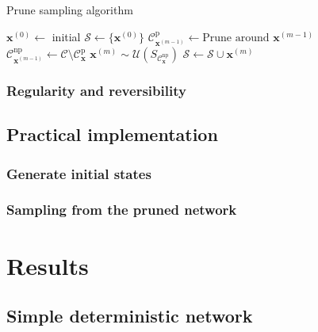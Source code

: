 \documentclass[a4paper, twoside, 11pt]{report}
\theoremstyle{plain}
\theoremstyle{definition}
\theoremstyle{remark}
\newcommand{\C}{{\mathcal C}}
\newcommand{\U}{{\mathcal{U}}}
\newcommand{\bfx}{{\mathbf{x}}}
\begin{document}
\begin{algorithm}[h!]
\renewcommand\thealgorithm{1}
\caption{Prune sampling algorithm}
\label{prunealg}
\begin{algorithmic}
\State $\mathbf{x}^{(0)} \gets $ initial
     \State $\mathcal{S} \gets \{\mathbf{x}^{(0)}\}$
     \State $\C_{\bfx^{(m-1)}}^{\text{p}} \gets \text{Prune around } \mathbf{x}^{(m-1)}$ \\ 
	\State $\C_{\bfx^{(m-1)}}^{\text{np}} \gets \mathcal{C} \setminus \C_\bfx^{\text{p}}$  
     \State $\mathbf{x}^{(m)} \sim  \U(S_{\C_\bfx^{\text{np}}}) $ 
     \State $\mathcal{S} \gets \mathcal{S} \cup \mathbf{x}^{(m)}$
     \EndFor
     \State {}
\EndFunction
\end{algorithmic}
\end{algorithm}



\subsection{Regularity and reversibility}

\section{Practical implementation}\label{sec:prune_2}
\subsection{Generate initial states}
\subsection{Sampling from the pruned network}

\chapter{Results}

\section{Simple deterministic network}
\end{document}
